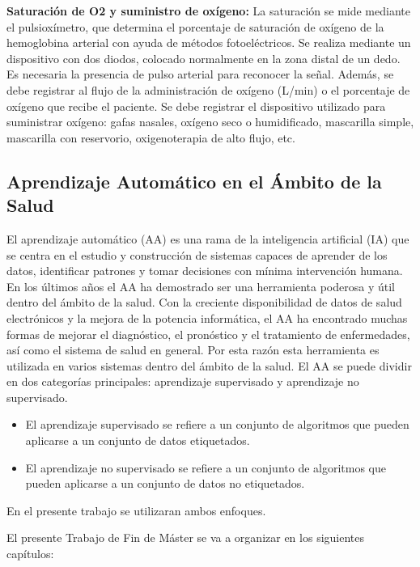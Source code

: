 \textbf{Saturación de O2 y suministro de oxígeno:} La saturación se mide mediante el pulsioxímetro, que determina el porcentaje de saturación de oxígeno de la hemoglobina arterial con ayuda de métodos fotoeléctricos. Se realiza mediante un dispositivo con dos diodos, colocado normalmente en la zona distal de un dedo. Es necesaria la presencia de pulso arterial para reconocer la señal. Además, se debe registrar al flujo de la administración de oxígeno (L/min) o el porcentaje de oxígeno que recibe el paciente.  Se debe registrar el dispositivo utilizado para suministrar oxígeno: gafas nasales, oxígeno seco o humidificado, mascarilla simple, mascarilla con reservorio, oxigenoterapia de alto flujo, etc. 


\subsection{Aprendizaje Automático en el Ámbito de la Salud}

El aprendizaje automático (AA) es una rama de la inteligencia artificial (IA) que se centra en el estudio y construcción de sistemas capaces de aprender de los datos, identificar patrones y tomar decisiones con mínima intervención humana. En los últimos años el AA ha demostrado ser una herramienta poderosa y útil dentro del ámbito de la salud. Con la creciente disponibilidad de datos de salud electrónicos y la mejora de la potencia informática, el AA ha encontrado muchas formas de mejorar el diagnóstico, el pronóstico y el tratamiento de enfermedades, así como el sistema de salud en general. Por esta razón esta herramienta es utilizada en varios sistemas dentro del ámbito de la salud. El AA se puede dividir en dos categorías principales: aprendizaje supervisado y aprendizaje no supervisado.

\begin{itemize}
    \item El aprendizaje supervisado se refiere a un conjunto de algoritmos que pueden aplicarse a un conjunto de datos etiquetados. 
    \item El aprendizaje no supervisado se refiere a un conjunto de algoritmos que pueden aplicarse a un conjunto de datos no etiquetados.
\end{itemize}

En el presente trabajo se utilizaran ambos enfoques.

El presente Trabajo de Fin de Máster se va a organizar en los siguientes capítulos:

